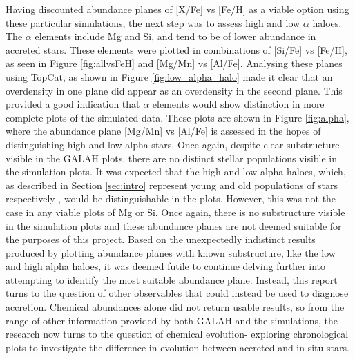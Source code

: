 \documentclass[fleqn,usenatbib]{mnras}
\begin{document}
Having discounted abundance planes of [X/Fe] vs [Fe/H] as a viable option using these particular simulations, the next step was to assess high and low $\alpha$ haloes. The $\alpha$ elements include Mg and Si, and tend to be of lower abundance in accreted stars. These elements were plotted in combinations of [Si/Fe] vs [Fe/H], as seen in Figure \ref{fig:allvsFeH} and [Mg/Mn] vs [Al/Fe]. Analysing these planes using TopCat, as shown in Figure \ref{fig:low_alpha_halo} made it clear that an overdensity in one plane did appear as an overdensity in the second plane. This provided a good indication that $\alpha$ elements would show distinction in more complete plots of the simulated data. These plots are shown in Figure \ref{fig:alpha}, where the abundance plane [Mg/Mn] vs [Al/Fe] is assessed in the hopes of distinguishing high and low alpha stars.  
Once again, despite clear substructure visible in the GALAH plots, there are no distinct stellar populations visible in the simulation plots. It was expected that the high and low alpha haloes, which, as described in Section \ref{sec:intro} represent young and old populations of stars respectively \citep{Das2020}, would be distinguishable in the plots. However, this was not the case in any viable plots of Mg or Si. Once again, there is no substructure visible in the simulation plots and these abundance planes are not deemed suitable for the purposes of this project.  
Based on the unexpectedly indistinct results produced by plotting abundance planes with known substructure, like the low and high alpha haloes, it was deemed futile to continue delving further into attempting to identify the most suitable abundance plane. Instead, this report turns to the question of other observables that could instead be used to diagnose accretion. Chemical abundances alone did not return usable results, so from the range of other information provided by both GALAH and the simulations, the research now turns to the question of chemical evolution- exploring chronological plots to investigate the difference in evolution between accreted and in situ stars.  



\end{document}
